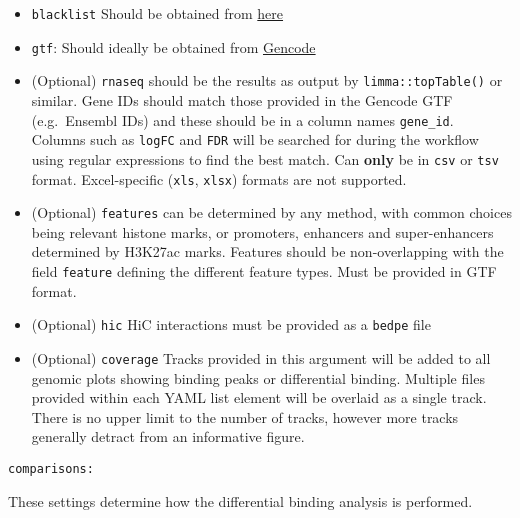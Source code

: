 \documentclass[
]{book}
\providecommand{\tightlist}{%
  \setlength{\itemsep}{0pt}\setlength{\parskip}{0pt}}
\begin{document}
\begin{itemize}
\tightlist
\item
  \texttt{blacklist} Should be obtained from \href{https://github.com/Boyle-Lab/Blacklist/tree/master/lists}{here}
\item
  \texttt{gtf}: Should ideally be obtained from \href{https://www.gencodegenes.org/}{Gencode}
\item
  (Optional) \texttt{rnaseq} should be the results as output by \texttt{limma::topTable()} or similar. Gene IDs should match those provided in the Gencode GTF (e.g.~Ensembl IDs) and these should be in a column names \texttt{gene\_id}. Columns such as \texttt{logFC} and \texttt{FDR} will be searched for during the workflow using regular expressions to find the best match. Can \textbf{only} be in \texttt{csv} or \texttt{tsv} format. Excel-specific (\texttt{xls}, \texttt{xlsx}) formats are not supported.
\item
  (Optional) \texttt{features} can be determined by any method, with common choices being relevant histone marks, or promoters, enhancers and super-enhancers determined by H3K27ac marks. Features should be non-overlapping with the field \texttt{feature} defining the different feature types. Must be provided in GTF format.
\item
  (Optional) \texttt{hic} HiC interactions must be provided as a \texttt{bedpe} file
\item
  (Optional) \texttt{coverage} Tracks provided in this argument will be added to all genomic plots showing binding peaks or differential binding. Multiple files provided within each YAML list element will be overlaid as a single track. There is no upper limit to the number of tracks, however more tracks generally detract from an informative figure.
\end{itemize}

\texttt{comparisons:}

These settings determine how the differential binding analysis is performed.
\end{document}
